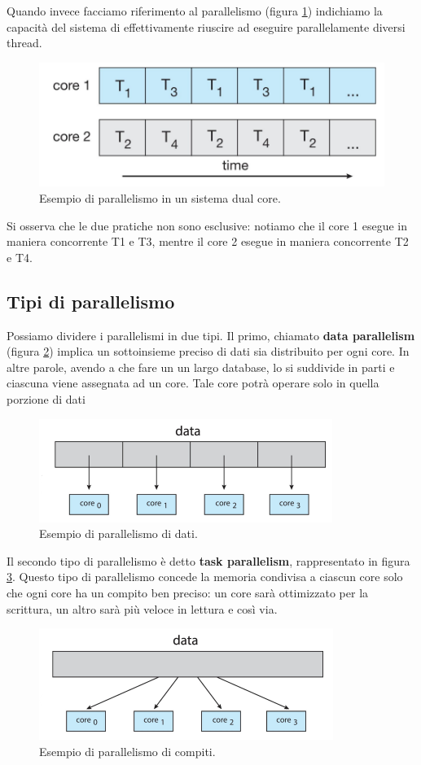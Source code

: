 Quando invece facciamo riferimento al parallelismo (figura \ref{fig:parallelismo}) indichiamo la capacità del sistema di effettivamente riuscire ad eseguire parallelamente diversi thread. 
\begin{figure}[!h]
    \centering
    \includegraphics[width=.5\textwidth]{../res/imgs/threads/parallelismo.png}
    \caption{Esempio di parallelismo in un sistema dual core.}
    \label{fig:parallelismo}
\end{figure}
Si osserva che le due pratiche non sono esclusive: notiamo che il core 1 esegue in maniera concorrente T1 e T3, mentre il core 2 esegue in maniera concorrente T2 e T4.

\subsection{Tipi di parallelismo}
Possiamo dividere i parallelismi in due tipi. Il primo, chiamato \textbf{data parallelism} (figura \ref{fig:data_parallelism}) implica un sottoinsieme preciso di dati sia distribuito per ogni core. In altre parole, avendo a che fare un un largo database, lo si suddivide in parti e ciascuna viene assegnata ad un core. Tale core potrà operare solo in quella porzione di dati
\begin{figure}[!h]
    \centering
    \includegraphics[width = .5\textwidth]{../res/imgs/threads/data_parallelism.png}
    \caption{Esempio di parallelismo di dati.}
    \label{fig:data_parallelism}
\end{figure}

\noindent Il secondo tipo di parallelismo è detto \textbf{task parallelism}, rappresentato in figura \ref{fig:task_parallelism}. Questo tipo di parallelismo concede la memoria condivisa a ciascun core solo che ogni core ha un compito ben preciso: un core sarà ottimizzato per la scrittura, un altro sarà più veloce in lettura e così via.
\begin{figure}[!h]
    \centering
    \includegraphics[width=.5\textwidth]{../res/imgs/threads/task_parallelism.png}
    \caption{Esempio di parallelismo di compiti.}
    \label{fig:task_parallelism}
\end{figure}
% 
